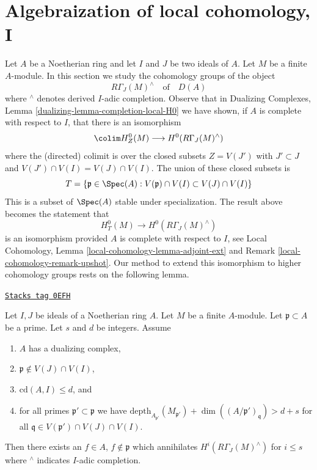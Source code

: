 \section{Algebraization of local cohomology, I}
\label{algebraization-section-algebraization-sections-general}
Let $A$ be a Noetherian ring and let $I$ and $J$ be two ideals of $A$.
Let $M$ be a finite $A$-module. In this section we study the
cohomology groups of the object
$$
R\Gamma_J(M)^\wedge
\quad\text{of}\quad
D(A)
$$
where ${}^\wedge$ denotes derived $I$-adic completion. Observe that in
Dualizing Complexes, Lemma \ref{dualizing-lemma-completion-local-H0}
we have shown, if $A$ is complete with respect to $I$,
that there is an isomorphism
$$
\colim H^0_Z(M) \longrightarrow H^0(R\Gamma_J(M)^\wedge)
$$
where the (directed) colimit is over the closed subsets $Z = V(J')$
with $J' \subset J$ and $V(J') \cap V(I) = V(J) \cap V(I)$.
The union of these closed subsets is
\begin{equation}
\label{equation-associated-subset}
T = \{\mathfrak p \in \Spec(A) :
V(\mathfrak p) \cap V(I) \subset V(J) \cap V(I)\}
\end{equation}
This is a subset of $\Spec(A)$ stable under specialization.
The result above becomes the statement that
$$
H^0_T(M) \longrightarrow H^0(R\Gamma_J(M)^\wedge)
$$
is an isomorphism provided $A$ is complete with respect to $I$, see
Local Cohomology, Lemma \ref{local-cohomology-lemma-adjoint-ext} and
Remark \ref{local-cohomology-remark-upshot}.
Our method to extend this isomorphism to higher cohomology groups
rests on the following lemma.

\begin{lemma}
\label{algebraization-lemma-kill-completion-general}
\href{https://stacks.math.columbia.edu/tag/0EFH}{\texttt{Stacks tag 0EFH}}

Let $I, J$ be ideals of a Noetherian ring $A$.
Let $M$ be a finite $A$-module. Let $\mathfrak p \subset A$ be a prime.
Let $s$ and $d$ be integers. Assume
\begin{enumerate}
\item $A$ has a dualizing complex,
\item $\mathfrak p \not \in V(J) \cap V(I)$,
\item $\text{cd}(A, I) \leq d$, and
\item for all primes $\mathfrak p' \subset \mathfrak p$
we have
$\text{depth}_{A_{\mathfrak p'}}(M_{\mathfrak p'}) +
\dim((A/\mathfrak p')_\mathfrak q) > d + s$
for all $\mathfrak q \in V(\mathfrak p') \cap V(J) \cap V(I)$.
\end{enumerate}
Then there exists an $f \in A$, $f \not \in \mathfrak p$ which annihilates
$H^i(R\Gamma_J(M)^\wedge)$ for $i \leq s$ where ${}^\wedge$
indicates $I$-adic completion.
\end{lemma}

